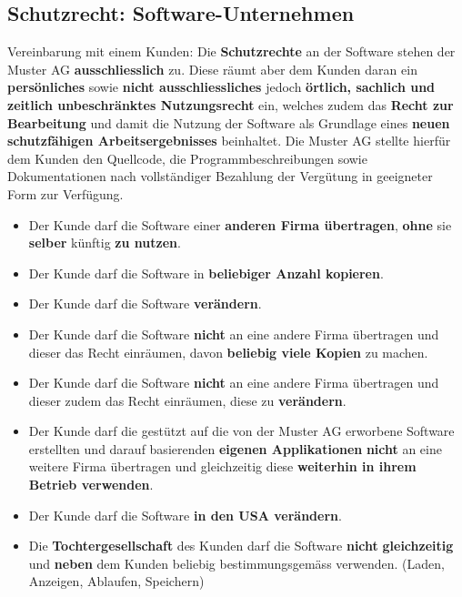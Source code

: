\subsection{Schutzrecht: Software-Unternehmen}
Vereinbarung mit einem Kunden: Die \textbf{Schutzrechte} an der Software stehen der Muster AG \textbf{ausschliesslich} zu. Diese räumt aber dem Kunden daran ein \textbf{persönliches} sowie \textbf{nicht ausschliessliches} jedoch \textbf{örtlich, sachlich und zeitlich unbeschränktes Nutzungsrecht} ein, welches zudem das \textbf{Recht zur Bearbeitung} und damit die Nutzung der Software als Grundlage eines \textbf{neuen schutzfähigen Arbeitsergebnisses} beinhaltet. Die Muster AG stellte hierfür dem Kunden den Quellcode, die Programmbeschreibungen sowie Dokumentationen nach vollständiger Bezahlung der Vergütung in geeigneter Form zur Verfügung.
\begin{itemize}
	\item Der Kunde darf die Software einer \textbf{anderen Firma übertragen}, \textbf{ohne} sie \textbf{selber} künftig \textbf{zu nutzen}.
	\item Der Kunde darf die Software in \textbf{beliebiger Anzahl kopieren}.
	\item Der Kunde darf die Software \textbf{verändern}.
	\item Der Kunde darf die Software \textbf{nicht} an eine andere Firma übertragen und dieser das Recht einräumen, davon \textbf{beliebig viele Kopien} zu machen.
	\item Der Kunde darf die Software \textbf{nicht} an eine andere Firma übertragen und dieser zudem das Recht einräumen, diese zu \textbf{verändern}.
	\item Der Kunde darf die gestützt auf die von der Muster AG erworbene Software erstellten und darauf basierenden \textbf{eigenen Applikationen} \textbf{nicht} an eine weitere Firma übertragen und gleichzeitig diese \textbf{weiterhin in ihrem Betrieb verwenden}.
	\item Der Kunde darf die Software \textbf{in den USA verändern}.
	\item Die \textbf{Tochtergesellschaft} des Kunden darf die Software \textbf{nicht} \textbf{gleichzeitig} und \textbf{neben} dem Kunden beliebig bestimmungsgemäss verwenden. (Laden, Anzeigen, Ablaufen, Speichern)
\end{itemize}

